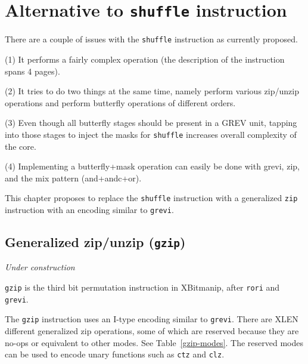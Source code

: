 \chapter{Alternative to \texttt{shuffle} instruction}

There are a couple of issues with the {\tt shuffle} instruction as currently proposed.

(1) It performs a fairly complex operation (the description of the instruction
spans 4 pages).

(2) It tries to do two things at the same time, namely perform various zip/unzip
operations and perform butterfly operations of different orders.

(3) Even though all butterfly stages should be present in a GREV unit, tapping into
those stages to inject the masks for {\tt shuffle} increases overall complexity of
the core.

(4) Implementing a butterfly+mask operation can easily be done with grevi, zip,
and the mix pattern (and+andc+or).

This chapter proposes to replace the {\tt shuffle} instruction with a generalized
{\tt zip} instruction with an encoding similar to {\tt grevi}.


\section{Generalized zip/unzip (\texttt{gzip})}
\label{gzip}

{\it Under construction}

{\tt gzip} is the third bit permutation instruction in XBitmanip, after {\tt rori}
and {\tt grevi}.

The {\tt gzip} instruction uses an I-type encoding similar to {\tt grevi}. There
are XLEN different generalized zip operations, some of which are reserved because
they are no-ops or equivalent to other modes. See Table~\ref{gzip-modes}. The
reserved modes can be used to encode unary functions such as {\tt ctz} and {\tt clz}.

